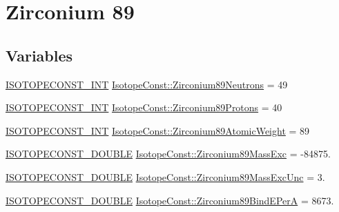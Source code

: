 \hypertarget{group___isotope_const-_zirconium-_zr89}{}\section{Zirconium 89}
\label{group___isotope_const-_zirconium-_zr89}
\subsection*{Variables}
\begin{DoxyCompactItemize}
\item 
\mbox{\hyperlink{group___isotope_const-_macros_ga5f18360b3e99483a35c32d789e62621c}{I\+S\+O\+T\+O\+P\+E\+C\+O\+N\+S\+T\+\_\+\+I\+NT}} \mbox{\hyperlink{group___isotope_const-_zirconium-_zr89_gaf617837c49e403f756316340c712a45d}{Isotope\+Const\+::\+Zirconium89\+Neutrons}} = 49
\item 
\mbox{\hyperlink{group___isotope_const-_macros_ga5f18360b3e99483a35c32d789e62621c}{I\+S\+O\+T\+O\+P\+E\+C\+O\+N\+S\+T\+\_\+\+I\+NT}} \mbox{\hyperlink{group___isotope_const-_zirconium-_zr89_ga2d42459543e54a32983d7ad5c23caa17}{Isotope\+Const\+::\+Zirconium89\+Protons}} = 40
\item 
\mbox{\hyperlink{group___isotope_const-_macros_ga5f18360b3e99483a35c32d789e62621c}{I\+S\+O\+T\+O\+P\+E\+C\+O\+N\+S\+T\+\_\+\+I\+NT}} \mbox{\hyperlink{group___isotope_const-_zirconium-_zr89_ga3e654d42f11c0e6c82bce9b8e297a088}{Isotope\+Const\+::\+Zirconium89\+Atomic\+Weight}} = 89
\item 
\mbox{\hyperlink{group___isotope_const-_macros_ga8f45a7272ce02c0b4c65c44636ed719a}{I\+S\+O\+T\+O\+P\+E\+C\+O\+N\+S\+T\+\_\+\+D\+O\+U\+B\+LE}} \mbox{\hyperlink{group___isotope_const-_zirconium-_zr89_gaec438dc2b5de3860366b77295f51768c}{Isotope\+Const\+::\+Zirconium89\+Mass\+Exc}} = -\/84875.
\item 
\mbox{\hyperlink{group___isotope_const-_macros_ga8f45a7272ce02c0b4c65c44636ed719a}{I\+S\+O\+T\+O\+P\+E\+C\+O\+N\+S\+T\+\_\+\+D\+O\+U\+B\+LE}} \mbox{\hyperlink{group___isotope_const-_zirconium-_zr89_ga2e8ba7954ba2bc1f4fa9e779b33e8c14}{Isotope\+Const\+::\+Zirconium89\+Mass\+Exc\+Unc}} = 3.
\item 
\mbox{\hyperlink{group___isotope_const-_macros_ga8f45a7272ce02c0b4c65c44636ed719a}{I\+S\+O\+T\+O\+P\+E\+C\+O\+N\+S\+T\+\_\+\+D\+O\+U\+B\+LE}} \mbox{\hyperlink{group___isotope_const-_zirconium-_zr89_ga4fb3978872fee7f585a2b770e87b82b1}{Isotope\+Const\+::\+Zirconium89\+Bind\+E\+PerA}} = 8673.
\item 

\end{DoxyCompactItemize}
